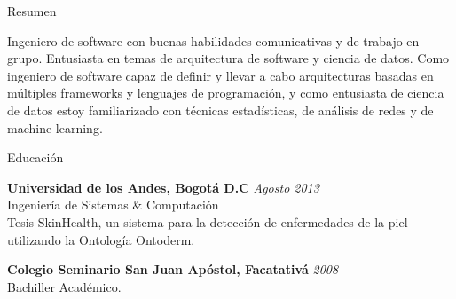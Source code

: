 \documentclass[spanish]{resume} %
\begin{document}

\begin{rSection}{Resumen}

Ingeniero de software con buenas habilidades comunicativas y de trabajo en grupo. Entusiasta en temas de arquitectura de software y ciencia de datos. Como ingeniero de software capaz de definir y llevar a cabo arquitecturas basadas en m\'ultiples frameworks y lenguajes de programaci\'on, y como entusiasta de ciencia de datos estoy familiarizado con t\'ecnicas estad\'isticas, de an\'alisis de redes y de machine learning.

\end{rSection}


\begin{rSection}{Educaci\'on}

{\bf Universidad de los Andes, Bogot\'a D.C} \hfill {\em Agosto 2013} \\
Ingenier\'ia de Sistemas \& Computaci\'on \\
Tesis SkinHealth, un sistema para la detecci\'on de enfermedades de la piel utilizando la Ontolog\'ia Ontoderm.

{\bf Colegio Seminario San Juan Ap\'ostol, Facatativ\'a} \hfill {\em 2008} \\
Bachiller Acad\'emico.

\end{rSection}
\end{document}
